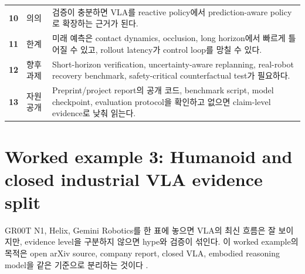 \begin{table}[t]
\begin{tabularx}{\textwidth}{>{\bfseries}p{8mm}p{24mm}X}
    10 & 의의 & 검증이 충분하면 VLA를 reactive policy에서 prediction-aware policy로 확장하는 근거가 된다. \\
    11 & 한계 & 미래 예측은 contact dynamics, occlusion, long horizon에서 빠르게 틀어질 수 있고, rollout latency가 control loop를 망칠 수 있다. \\
    12 & 향후 과제 & Short-horizon verification, uncertainty-aware replanning, real-robot recovery benchmark, safety-critical counterfactual test가 필요하다. \\
    13 & 자원 공개 & Preprint/project report의 공개 코드, benchmark script, model checkpoint, evaluation protocol을 확인하고 없으면 claim-level evidence로 낮춰 읽는다. \\
    \bottomrule
  \end{tabularx}
\end{table}

\section{Worked example 3: Humanoid and closed industrial VLA evidence split}

GR00T N1, Helix, Gemini Robotics를 한 표에 놓으면 VLA의 최신 흐름은 잘 보이지만, evidence level을 구분하지 않으면 hype와 검증이 섞인다. 이 worked example의 목적은 open arXiv source, company report, closed VLA, embodied reasoning model을 같은 기준으로 분리하는 것이다 \citep{grootn1,helix,geminirobotics,geminiroboticser}.

